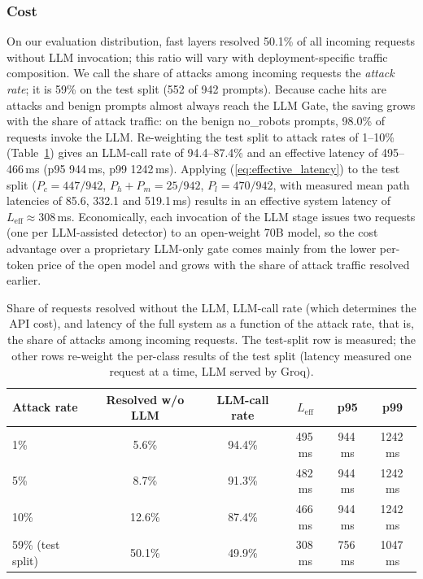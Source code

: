 \documentclass[runningheads]{llncs}
\newif\ifrev
\newcommand{\rev}[1]{\ifrev\hl{#1}\else#1\fi}                  %
\begin{document}
\subsubsection{Cost}
On our evaluation distribution, fast layers resolved \rev{50.1\%} of all
incoming requests without LLM invocation; this ratio will vary with
deployment-specific traffic composition. \rev{We call the share of attacks among incoming requests the \emph{attack rate}; it is 59\% on the test split (552 of 942 prompts).} \rev{Because cache hits are attacks and benign prompts almost always reach the LLM Gate, the saving grows with the share of attack traffic: on the benign no\_robots prompts, 98.0\% of requests invoke the LLM. Re-weighting the test split to attack rates of 1--10\% (Table~\ref{tab:prevalence}) gives an LLM-call rate of 94.4--87.4\% and an effective latency of 495--466\,ms (p95 944\,ms, p99 1242\,ms).} Applying (\ref{eq:effective_latency}) to the \rev{test} split (\rev{$P_c{=}447/942$, $P_h{+}P_m{=}25/942$, $P_l{=}470/942$, with measured mean path latencies of 85.6, 332.1 and 519.1\,ms}) results in an effective system latency of \rev{$L_{\text{eff}} \approx 308$\,ms}. \rev{Economically, each invocation of the LLM stage issues two requests (one per LLM-assisted detector) to an open-weight 70B model, so the cost advantage over a proprietary LLM-only gate comes mainly from the lower per-token price of the open model and grows with the share of attack traffic resolved earlier.}


\begin{table}[h]
\centering
\scriptsize
\begin{tabular}{@{}lccccc@{}}
\toprule
\rev{\textbf{Attack rate}} & \rev{\textbf{Resolved w/o LLM}} & \rev{\textbf{LLM-call rate}} & \rev{\textbf{$L_{\mathrm{eff}}$}} & \rev{\textbf{p95}} & \rev{\textbf{p99}} \\
\midrule
\rev{1\%} & \rev{5.6\%} & \rev{94.4\%} & \rev{495\,ms} & \rev{944\,ms} & \rev{1242\,ms} \\
\rev{5\%} & \rev{8.7\%} & \rev{91.3\%} & \rev{482\,ms} & \rev{944\,ms} & \rev{1242\,ms} \\
\rev{10\%} & \rev{12.6\%} & \rev{87.4\%} & \rev{466\,ms} & \rev{944\,ms} & \rev{1242\,ms} \\
\rev{59\% (test split)} & \rev{50.1\%} & \rev{49.9\%} & \rev{308\,ms} & \rev{756\,ms} & \rev{1047\,ms} \\
\bottomrule
\end{tabular}
\caption{\protect\rev{Share of requests resolved without the LLM, LLM-call rate (which determines the API cost), and latency of the full system as a function of the attack rate, that is, the share of attacks among incoming requests. The test-split row is measured; the other rows re-weight the per-class results of the test split (latency measured one request at a time, LLM served by Groq).}}
\label{tab:prevalence}
\vspace{-7mm}
\end{table}
\end{document}
